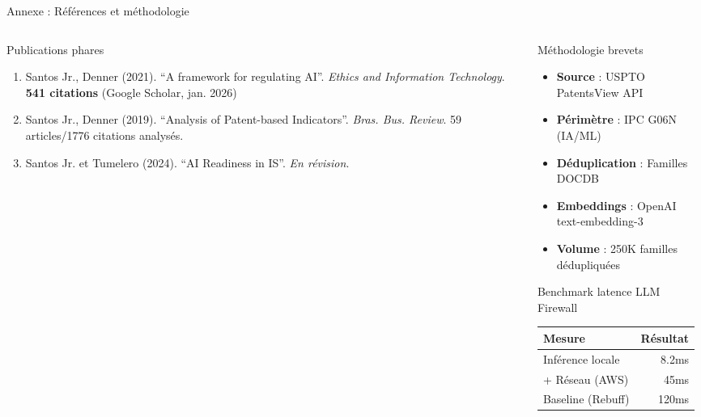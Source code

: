 \documentclass[aspectratio=169,11pt]{beamer}
\begin{document}
\begin{frame}{Annexe : Références et méthodologie}
  \scriptsize
  \begin{columns}[T]
    \begin{column}{0.48\textwidth}
      \begin{block}{Publications phares}
        \begin{enumerate}
          \item Santos Jr., Denner (2021). ``A framework for regulating AI''. \textit{Ethics and Information Technology}. \textbf{541 citations} (Google Scholar, jan. 2026)
          \item Santos Jr., Denner (2019). ``Analysis of Patent-based Indicators''. \textit{Bras. Bus. Review}. 59 articles/1776 citations analysés.
          \item Santos Jr. et Tumelero (2024). ``AI Readiness in IS''. \textit{En révision}.
        \end{enumerate}
      \end{block}
    \end{column}
    \begin{column}{0.48\textwidth}
      \begin{block}{Méthodologie brevets}
        \begin{itemize}
          \item \textbf{Source} : USPTO PatentsView API
          \item \textbf{Périmètre} : IPC G06N (IA/ML)
          \item \textbf{Déduplication} : Familles DOCDB
          \item \textbf{Embeddings} : OpenAI text-embedding-3
          \item \textbf{Volume} : 250K familles dédupliquées
        \end{itemize}
      \end{block}
      
      \begin{block}{Benchmark latence LLM Firewall}
        \begin{tabular}{lr}
          \textbf{Mesure} & \textbf{Résultat} \\
          \hline
          Inférence locale & 8.2ms \\
          + Réseau (AWS) & 45ms \\
          Baseline (Rebuff) & 120ms \\
        \end{tabular}
      \end{block}
    \end{column}
  \end{columns}
\end{frame}
\end{document}
